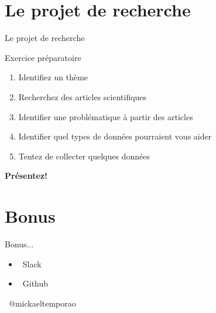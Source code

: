 \documentclass[10pt]{beamer}
\begin{document}
\section{Le projet de recherche}

\begin{frame}{Le projet de recherche}
    \begin{block}{Exercice préparatoire}
    \end{block}
    \begin{enumerate}
        \item Identifiez un thème
        \item Recherchez des articles scientifiques
        \item Identifier une problématique à partir des articles
        \item Identifier quel types de données pourraient vous aider
        \item Tentez de collecter quelques données
    \end{enumerate}

\textbf{Présentez!}

\end{frame}

\section{Bonus}

\begin{frame}{Bonus...}
        \begin{itemize}
            \item[] \faSlack ~Slack
            \item[] \faGithubSquare~Github
        \end{itemize}
\end{frame}


\begin{frame}[standout]
    \begin{flushright}
        \vspace{100pt}
        \small\faTwitter~$@$mickaeltemporao
    \end{flushright}
\end{frame}
\end{document}
